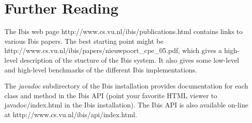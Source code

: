 \documentclass[10pt]{article}
\newcommand{\mysection}[1]{\section{#1}\label{#1}}
\begin{document}
\mysection{Further Reading}

The Ibis web page http://www.cs.vu.nl/ibis/publications.html
contains links to various Ibis papers.
The best starting point might be \\
http://www.cs.vu.nl/ibis/papers/nieuwpoort\_cpe\_05.pdf,
which gives a high-level description of the stucture of the Ibis system.
It also gives some low-level and high-level benchmarks of the different Ibis implementations.

The \emph{javadoc} subdirectory of the Ibis installation provides
documentation for each class and method in the Ibis API (point your favorite
HTML viewer to javadoc/index.html in the Ibis installation).
The Ibis API is also available on-line at http://www.cs.vu.nl/ibis/api/index.html.
\end{document}
